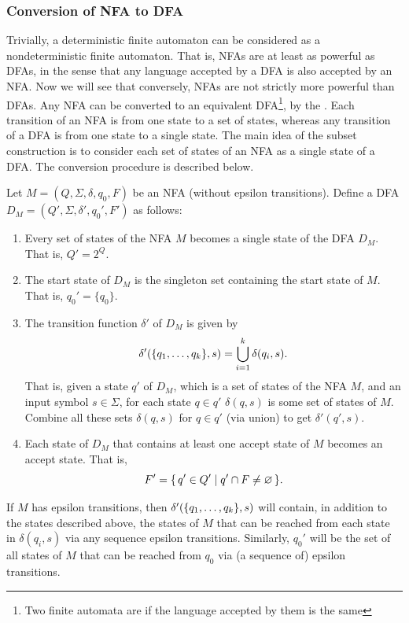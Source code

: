 \subsubsection{Conversion of NFA to DFA}\label{subsubsec:NFAtoDFA}

Trivially, a deterministic finite automaton can be considered as a nondeterministic finite automaton. That is, NFAs are at least as powerful as DFAs, in the sense that any language accepted by a DFA is also accepted by an NFA. Now we will see that conversely, NFAs are not strictly more powerful than DFAs. Any NFA can be converted to an equivalent DFA\footnote{Two finite automata are  if the language accepted by them is the same}, by the . Each transition of an NFA is from one state to a set of states, whereas any transition of a DFA is from one state to a single state. The main idea of the subset construction is to consider each set of states of an NFA as a single state of a DFA. The conversion procedure is described below.

Let $M = (Q, \Sigma, \delta, q_0, F)$ be an NFA (without epsilon transitions). Define a DFA $D_M = (Q', \Sigma, \delta', q_0', F')$ as follows:
\begin{enumerate}
\item Every set of states of the NFA $M$ becomes a single state of the DFA $D_M$. That is, $Q' = 2^Q$.
\item The start state of $D_M$ is the singleton set containing the start state of $M$. That is, $q_0' = \{q_0\}$.
\item The transition function $\delta'$ of $D_M$ is given by
\begin{equation*}
\delta'\pqty{ \{q_1, \ldots, q_k\}, s } = \bigcup_{i=1}^k \delta(q_i, s).
\end{equation*}
That is, given a state $q'$ of $D_M$, which is a set of states of the NFA $M$, and an input symbol $s \in \Sigma$, for each state $q \in q'$ $\delta(q, s)$ is some set of states of $M$. Combine all these sets $\delta(q, s)$ for $q \in q'$ (via union) to get $\delta'(q', s)$.
\item Each state of $D_M$ that contains at least one accept state of $M$ becomes an accept state. That is,
\begin{equation*}
F' = \qty{\, q' \in Q' \mid q' \cap F \ne \varnothing \,}.
\end{equation*}
\end{enumerate}

If $M$ has epsilon transitions, then $\delta'\pqty{ \{q_1, \ldots, q_k\}, s }$ will contain, in addition to the states described above, the states of $M$ that can be reached from each state in $\delta(q_i, s)$ via any sequence epsilon transitions. Similarly, $q_0'$ will be the set of all states of $M$ that can be reached from $q_0$ via (a sequence of) epsilon transitions.

